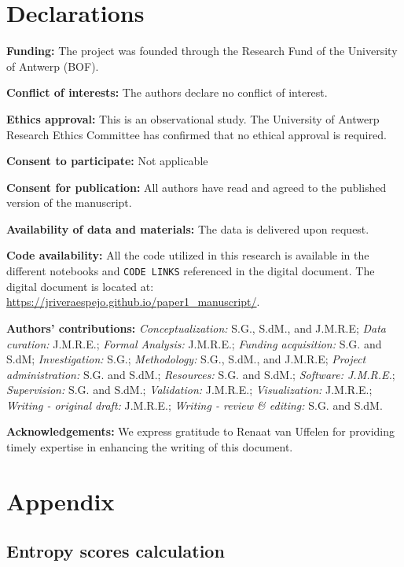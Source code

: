 \documentclass[
  authoryear,
  preprint,
  1p]{elsarticle}
\begin{document}
\newpage{}

\section*{Declarations}\label{declarations}

\textbf{Funding:} The project was founded through the Research Fund of
the University of Antwerp (BOF).

\textbf{Conflict of interests:} The authors declare no conflict of
interest.

\textbf{Ethics approval:} This is an observational study. The University
of Antwerp Research Ethics Committee has confirmed that no ethical
approval is required.

\textbf{Consent to participate:} Not applicable

\textbf{Consent for publication:} All authors have read and agreed to
the published version of the manuscript.

\textbf{Availability of data and materials:} The data is delivered upon
request.

\textbf{Code availability:} All the code utilized in this research is
available in the different notebooks and \texttt{CODE\ LINKS} referenced
in the digital document. The digital document is located at:
\url{https://jriveraespejo.github.io/paper1_manuscript/}.

\textbf{Authors' contributions:} \emph{Conceptualization:} S.G., S.dM.,
and J.M.R.E; \emph{Data curation:} J.M.R.E.; \emph{Formal Analysis:}
J.M.R.E.; \emph{Funding acquisition:} S.G. and S.dM;
\emph{Investigation:} S.G.; \emph{Methodology:} S.G., S.dM., and
J.M.R.E; \emph{Project administration:} S.G. and S.dM.;
\emph{Resources:} S.G. and S.dM.; \emph{Software: J.M.R.E.};
\emph{Supervision:} S.G. and S.dM.; \emph{Validation:} J.M.R.E.;
\emph{Visualization:} J.M.R.E.; \emph{Writing - original draft:}
J.M.R.E.; \emph{Writing - review \& editing:} S.G. and S.dM.

\textbf{Acknowledgements:} We express gratitude to Renaat van Uffelen
for providing timely expertise in enhancing the writing of this
document.

\newpage{}

\section{Appendix}\label{sec-appendix}

\subsection{Entropy scores calculation}\label{sec-appA}
\end{document}
